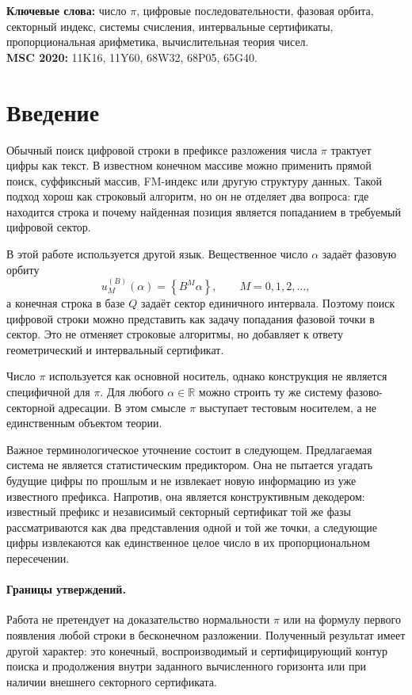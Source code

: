 \documentclass[11pt,a4paper]{article}
\newcommand{\fracpart}[1]{\left\{#1\right\}}
\newcommand{\R}{\mathbb{R}}
\begin{document}
\noindent\textbf{Ключевые слова:} число $\pi$, цифровые последовательности, фазовая орбита, секторный индекс, системы счисления, интервальные сертификаты, пропорциональная арифметика, вычислительная теория чисел.\\
\noindent\textbf{MSC 2020:} 11K16, 11Y60, 68W32, 68P05, 65G40.

\tableofcontents
\newpage

\section{Введение}

Обычный поиск цифровой строки в префиксе разложения числа $\pi$ трактует цифры как текст.  В известном конечном массиве можно применить прямой поиск, суффиксный массив, FM-индекс или другую структуру данных.  Такой подход хорош как строковый алгоритм, но он не отделяет два вопроса: где находится строка и почему найденная позиция является попаданием в требуемый цифровой сектор.

В этой работе используется другой язык.  Вещественное число $\alpha$ задаёт фазовую орбиту
\[
  u_M^{(B)}(\alpha)=\fracpart{B^M\alpha},\qquad M=0,1,2,\dots,
\]
а конечная строка в базе $Q$ задаёт сектор единичного интервала.  Поэтому поиск цифровой строки можно представить как задачу попадания фазовой точки в сектор.  Это не отменяет строковые алгоритмы, но добавляет к ответу геометрический и интервальный сертификат.

Число $\pi$ используется как основной носитель, однако конструкция не является специфичной для $\pi$.  Для любого $\alpha\in\R$ можно строить ту же систему фазово-секторной адресации.  В этом смысле $\pi$ выступает тестовым носителем, а не единственным объектом теории.

Важное терминологическое уточнение состоит в следующем.  Предлагаемая система не является статистическим предиктором.  Она не пытается угадать будущие цифры по прошлым и не извлекает новую информацию из уже известного префикса.  Напротив, она является конструктивным декодером: известный префикс и независимый секторный сертификат той же фазы рассматриваются как два представления одной и той же точки, а следующие цифры извлекаются как единственное целое число в их пропорциональном пересечении.

\paragraph{Границы утверждений.}  Работа не претендует на доказательство нормальности $\pi$ или на формулу первого появления любой строки в бесконечном разложении.  Полученный результат имеет другой характер: это конечный, воспроизводимый и сертифицирующий контур поиска и продолжения внутри заданного вычисленного горизонта или при наличии внешнего секторного сертификата.
\end{document}
